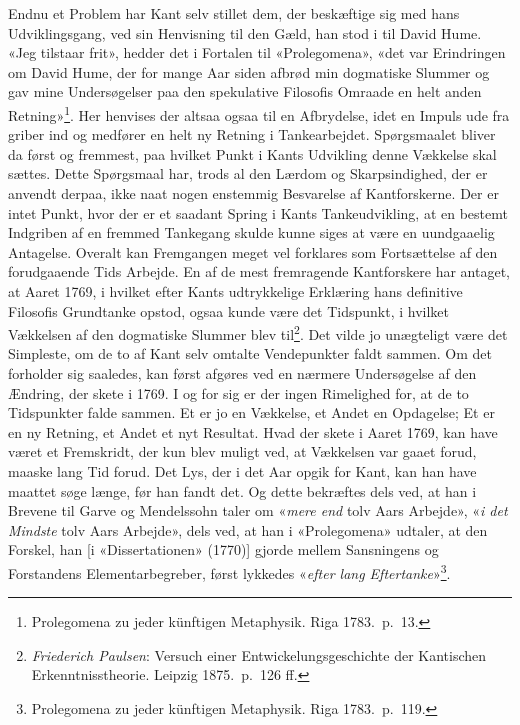 \documentclass[12pt,a4paper]{article}
\newcommand{\apage}[1]{\marginnote{\footnotesize\textit{[#1]}}}
\begin{document}
Endnu et Problem har Kant selv stillet dem, der beskæftige sig med hans
Udviklingsgang, ved sin Henvisning til den Gæld, han stod i til David
Hume. «Jeg tilstaar frit», hedder det i Fortalen til «Prolegomena», «det
var Erindringen om David Hume, der for mange Aar siden afbrød min
dogmatiske Slummer og gav mine Undersøgelser paa den spekulative
Filosofis Omraade en helt anden Retning»\footnote{Prolegomena zu
jeder künftigen Metaphysik. Riga 1783.\ p.\ 13.}. Her henvises der
altsaa ogsaa til en Afbrydelse, idet en Impuls ude fra griber ind og
medfører en helt ny Retning i  \apage{7} Tankearbejdet. Spørgsmaalet bliver da
først og fremmest, paa hvilket Punkt i Kants Udvikling denne Vækkelse
skal sættes. Dette Spørgsmaal har, trods al den Lærdom og Skarpsindighed,
der er anvendt derpaa, ikke naat nogen enstemmig Besvarelse af
Kantforskerne. Der er intet Punkt, hvor der er et saadant Spring i Kants
Tankeudvikling, at en bestemt Indgriben af en fremmed Tankegang skulde
kunne siges at være en uundgaaelig Antagelse. Overalt kan Fremgangen
meget vel forklares som Fortsættelse af den forudgaaende Tids Arbejde. En
af de mest fremragende Kantforskere har antaget, at Aaret 1769, i hvilket
efter Kants udtrykkelige Erklæring hans definitive Filosofis Grundtanke
opstod, ogsaa kunde være det Tidspunkt, i hvilket Vækkelsen af den
dogmatiske Slummer blev til\footnote{\emph{Friederich Paulsen}: Versuch
einer Entwickelungsgeschichte der Kantischen Erkenntnisstheorie.
Leipzig 1875.\ p.\ 126 ff.}. Det vilde jo unægteligt være det Simpleste,
om de to af Kant selv omtalte Vendepunkter faldt sammen. Om det forholder
sig saaledes, kan først afgøres ved en nærmere Undersøgelse af den
Ændring, der skete i 1769. I og for sig er der ingen Rimelighed for, at
de to Tidspunkter falde sammen. Et er jo en Vækkelse, et Andet en
Opdagelse; Et er en ny Retning, et Andet et nyt Resultat. Hvad der skete
i Aaret 1769, kan have været et Fremskridt, der kun blev muligt ved, at
Vækkelsen var gaaet forud, maaske lang Tid forud. Det Lys, der i det Aar
opgik for Kant, kan han have maattet søge længe, før han fandt det. Og
dette bekræftes dels ved, at han i Brevene til Garve og Mendelssohn taler
om «\emph{mere end} tolv Aars Arbejde», «\emph{i det Mindste} tolv Aars Arbejde», dels
ved, at han i «Prolegomena» udtaler, at den Forskel, han [i
«Dissertationen» (1770)] gjorde mellem Sansningens og Forstandens
Elementarbegreber, først lykkedes «\emph{efter lang
Eftertanke}»\footnote{Prolegomena zu jeder künftigen Metaphysik.
Riga 1783.\ p.\ 119.}.
\end{document}
